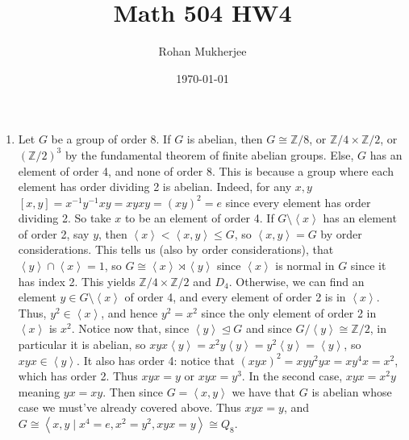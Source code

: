 \documentclass[12pt]{article}
\title{Math 504 HW4}
\date{\today}
\author{Rohan Mukherjee}
\theoremstyle{definitionstyle}
\def\mbb#1{\mathbb{#1}}
\newcommand{\Z}{\mbb Z}
\newcommand{\gen}[1]{\left\langle #1 \right\rangle}
\newcommand{\nsg}{\trianglelefteq}
\begin{document}
	\maketitle
	\begin{enumerate}[leftmargin=\labelsep]
		\item Let $G$ be a group of order 8. If $G$ is abelian, then $G \cong \Z/8$, or $\Z/4 \times \Z/2$, or $(\Z/2)^3$ by the fundamental theorem of finite abelian groups. Else, $G$ has an element of order 4, and none of order 8. This is because a group where each element has order dividing 2 is abelian. Indeed, for any $x,y$ $[x,y] = x^{-1}y^{-1}xy = xyxy = (xy)^2 = e$ since every element has order dividing 2. So take $x$ to be an element of order 4. If $G \setminus \gen{x}$ has an element of order 2, say $y$, then $\gen{x} < \gen{x, y} \leq G$, so $\gen{x, y} = G$ by order considerations. This tells us (also by order considerations), that $\gen{y} \cap \gen{x} = 1$, so $G \cong \gen{x} \rtimes \gen{y}$ since $\gen{x}$ is normal in $G$ since it has index 2. This yields $\Z/4 \times \Z/2$ and $D_4$. Otherwise, we can find an element $y \in G \setminus \gen{x}$ of order 4, and every element of order 2 is in $\gen{x}$. Thus, $y^2 \in \gen{x}$, and hence $y^2=x^2$ since the only element of order 2 in $\gen{x}$ is $x^2$. Notice now that, since $\gen{y} \nsg G$ and since $G/\gen{y} \cong \Z/2$, in particular it is abelian, so $xyx\gen{y} = x^2y\gen{y} = y^2\gen{y} = \gen{y}$, so $xyx \in \gen{y}$. It also has order 4: notice that $(xyx)^2 = xyy^2yx = xy^4x = x^2$, which has order 2. Thus $xyx = y$ or $xyx = y^3$. In the second case, $xyx = x^2y$ meaning $yx = xy$. Then since $G = \gen{x, y}$ we have that $G$ is abelian whose case we must've already covered above. Thus $xyx = y$, and $G \cong \gen{x, y \mid x^4 = e, x^2 = y^2, xyx = y} \cong Q_8$.
		

\end{enumerate}
\end{document}
